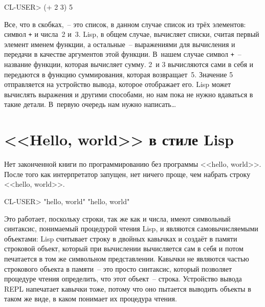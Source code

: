 \begin{myverb}
CL-USER> (+ 2 3)
5
\end{myverb}

Все, что в скобках,~-- это список, в данном случае список из трёх элементов: символ
\lstinline{+} и числа~2 и~3. Lisp, в общем случае, вычисляет списки, считая первый элемент
именем функции, а остальные~-- выражениями для вычисления и передачи в качестве аргументов
этой функции. В~нашем случае символ \lstinline{+}~-- название функции, которая вычисляет
сумму. 2~и 3 вычисляются сами в себя и передаются в функцию суммирования, которая
возвращает~5. Значение 5 отправляется на устройство вывода, которое отображает его. Lisp
может вычислять выражения и другими способами, но нам пока не нужно вдаваться в такие
детали.  В~первую очередь нам нужно написать\ldots

\section{<<Hello, world>> в стиле Lisp}

Нет законченной книги по программированию без программы <<hello,
world>>. После того как
интерпретатор запущен, нет ничего проще, чем набрать строку <<hello, world>>.

\begin{myverb}
CL-USER> "hello, world"
 "hello, world"
\end{myverb}

Это работает, поскольку строки, так же как и числа, имеют символьный синтаксис, понимаемый
процедурой чтения Lisp, и являются самовычисляемыми объектами: Lisp считывает строку в
двойных кавычках и создаёт в памяти строковой объект, который при вычислении вычисляется
сам в себя и потом печатается в том же символьном представлении.  Кавычки не являются
частью строкового объекта в памяти~-- это прос\-то синтаксис, который позволяет процедуре чтения
определить, что этот объект~-- строка. Устройство вывода REPL напечатает кавычки тоже,
потому что оно пытается выводить объекты в таком же виде, в каком понимает их процедура чтения.

